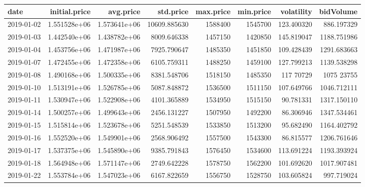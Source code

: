 \documentclass[10pt,a4paper]{article}
\begin{document}
			
	\begin{table}
		\centering
		\begin{tiny}
			{
				\begin{tabular}{lrrrrrrr}
					\textbf{date} &   \textbf{ initial.price} &    \textbf{avg.price} &     \textbf{std.price} &  \textbf{max.price} &  \textbf{min.price} &   \textbf{volatility} &    \textbf{bidVolume} \\ 
					\hline		
					2019-01-02 &   1.551528e+06 &  1.573641e+06 &  10609.885630 &  1588400   &  1545700   &      123.400320 &   886.197329 \\
					2019-01-03 &   1.442540e+06 &  1.438782e+06 &   8009.646338 &  1457150   &  1420850   &       145.819047 &  1188.751986 \\
					2019-01-04 &   1.453756e+06 &  1.471987e+06 &   7925.790647 &  1485350   &  1451850   &       109.428439 &  1291.683663 \\
					2019-01-07 &   1.472455e+06 &  1.472358e+06 &   6105.759311 &  1488250   &  1459100   &       127.799213 &  1139.538298 \\
					2019-01-08 &   1.490168e+06 &  1.500335e+06 &   8381.548706 &  1518150   &  1485350   &      117  70729 &  1075  23755 \\
					2019-01-10 &   1.513191e+06 &  1.526785e+06 &   5087.848872 &  1536500   &  1511150   &       107.649766 &  1046.712111 \\
					2019-01-11 &   1.530947e+06 &  1.522908e+06 &   4101.365889 &  1534950   &  1515150   &      90.781331 &  1317.150110 \\ 
					2019-01-14 &   1.500257e+06 &  1.499643e+06 &   2456.131227 &  1507950   &  1492200   &     86.306946 &  1347.534461 \\
					2019-01-15 &   1.515814e+06 &  1.523678e+06 &   5251.548539 &  1533850   &  1513200   &     95.682490 &  1164.402792 \\
					2019-01-16 &   1.552520e+06 &  1.549901e+06 &   2568.906492 &  1557500   &  1543300   &      86.815577 &  1206.761646 \\
					2019-01-17 &   1.537375e+06 &  1.545890e+06 &   9385.791843 &  1576450   &  1534600   &   113.691224 &  1193.393924 \\
					2019-01-18 &   1.564948e+06 &  1.571147e+06 &   2749.642228 &  1578750   &  1562200   &       101.692620 &  1017.907481 \\
					2019-01-22 &   1.553784e+06 &  1.547023e+06 &   6167.822659 &  1556750   &  1528750   &      103.605824 &   997.719024 \\

\end{tabular}}
\end{tiny}
\end{table}
\end{document}

